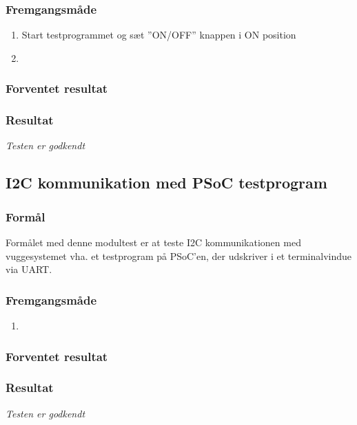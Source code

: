 \subsubsection*{Fremgangsmåde}
\begin{enumerate}
\item Start testprogrammet og sæt ''ON/OFF'' knappen i ON position
\item 

\end{enumerate}

\subsubsection*{Forventet resultat} 


\subsubsection*{Resultat} 


\textit{Testen er godkendt}

\subsection*{I2C kommunikation med PSoC testprogram}

\subsubsection*{Formål}
Formålet med denne modultest er at teste I2C kommunikationen med vuggesystemet vha. et testprogram på PSoC'en, der udskriver i et terminalvindue via UART.

\subsubsection*{Fremgangsmåde}
\begin{enumerate}
\item 

\end{enumerate}

\subsubsection*{Forventet resultat} 


\subsubsection*{Resultat} 


\textit{Testen er godkendt}